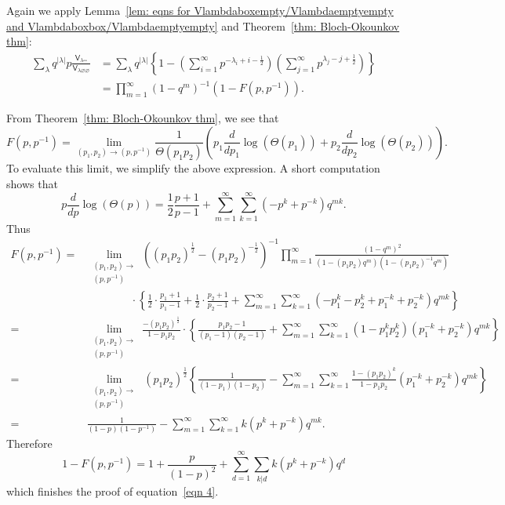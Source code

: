 \documentclass[12pt]{amsart}
\newcommand{\Vsf}{\mathsf{V}}
\newcommand{\bx}{\square}
\renewcommand{\emptyset}{\varnothing}
\newcommand{\half}{\frac{1}{2}}
\theoremstyle{definition}
\begin{document}
Again we apply Lemma~\ref{lem: eqns for
Vlambdaboxempty/Vlambdaemptyempty and Vlambdaboxbox/Vlambdaemptyempty}
and Theorem~\ref{thm: Bloch-Okounkov thm}:
\begin{align*}
\sum_{\lambda} q^{|\lambda |}p \frac{\Vsf_{\lambda \bx
\bx}}{\Vsf_{\lambda \emptyset \emptyset}} &= \sum_{\lambda}
q^{|\lambda
|}\left\{1-\left(\sum_{i=1}^{\infty}p^{-\lambda_{i}+i-\half}
\right)\left(\sum_{j=1}^{\infty}p^{\lambda_{j}-j+\half} \right)  \right\}\\
&= \prod_{m=1}^{\infty}(1-q^{m})^{-1} \left(1-F(p,p^{-1}) \right).
\end{align*}

From Theorem~\ref{thm: Bloch-Okounkov thm}, we see that 
\[
F(p,p^{-1}) = \lim_{ (p_{1},p_{2})\to (p,p^{-1}) } \frac{1}{\Theta
(p_{1}p_{2})} \left(p_{1}\frac{d}{dp_{1}}\log(\Theta (p_{1}))+ p_{2}\frac{d}{dp_{2}}\log(\Theta (p_{2})) \right).
\]
To evaluate this limit, we simplify the above expression. A short
computation shows that 
\[
p\frac{d}{dp}\log(\Theta (p)) = \half \frac{p+1}{p-1}
+\sum_{m=1}^{\infty}\sum_{k=1}^{\infty} \left(-p^{k}+p^{-k} \right)
q^{mk}.
\]
Thus
\begin{align*}
F(p,p^{-1}) =& \lim_{\begin{smallmatrix} (p_{1},p_{2})\to \\
(p,p^{-1}) \end{smallmatrix}}
\left((p_{1}p_{2})^{\half} - (p_{1}p_{2})^{-\half} \right)^{-1}
\prod_{m=1}^{\infty}
\frac{(1-q^{m})^{2}}{(1-(p_{1}p_{2})q^{m})(1-(p_{1}p_{2})^{-1}q^{m})} \\
&\quad \quad \quad \quad \cdot \left\{\half \cdot \frac{p_{1}+1}{p_{1}-1}+\half \cdot \frac{p_{2}+1}{p_{2}-1}
+\sum_{m=1}^{\infty}\sum_{k=1}^{\infty}
\left(-p_{1}^{k}-p_{2}^{k}+p_{1}^{-k}+p_{2}^{-k} \right)q^{mk}
\right\} \\
=&  \lim_{\begin{smallmatrix} (p_{1},p_{2})\to \\
(p,p^{-1}) \end{smallmatrix}}
\frac{-(p_{1}p_{2})^{\half}}{1-p_{1}p_{2}} \cdot
\left\{\frac{p_{1}p_{2}-1}{(p_{1}-1)(p_{2}-1)} +
\sum_{m=1}^{\infty}\sum_{k=1}^{\infty} (1-p_{1}^{k}p_{2}^{k})(p_{1}^{-k}+p_{2}^{-k})q^{mk} \right\}\\
= &  \lim_{\begin{smallmatrix} (p_{1},p_{2})\to \\
(p,p^{-1}) \end{smallmatrix}}
\,(p_{1}p_{2})^{\half} \left\{\frac{1}{(1-p_{1})(1-p_{2})} -
\sum_{m=1}^{\infty }\sum_{k=1}^{\infty } \frac{1-(p_{1}p_{2})^{k}}{1-p_{1}p_{2}}(p_{1}^{-k}+p_{2}^{-k})q^{mk} \right\}\\
=& \frac{1}{(1-p)(1-p^{-1})} - \sum_{m=1}^{\infty}\sum_{k=1}^{\infty}
k(p^{k}+p^{-k})q^{mk}. 
\end{align*}
Therefore 
\[
1-F(p,p^{-1}) = 1 +\frac{p}{(1-p)^{2}} + \sum_{d=1}^{\infty}\sum_{k|d}k(p^{k}+p^{-k})q^{d}
\]
which finishes the proof of equation~\eqref{eqn 4}.
\end{document}
